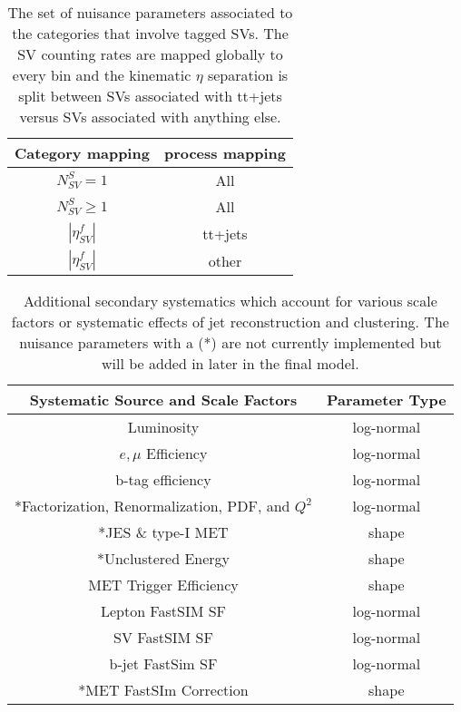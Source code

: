 \begin{table}
\centering
\caption{The set of nuisance parameters associated to the categories that involve tagged SVs. The SV counting rates are mapped globally to every bin and the kinematic $\eta$ separation is split between SVs associated with tt+jets versus SVs associated with anything else.}
\begin{tabular}{cc}
Category mapping & process mapping \\ 
\hline 
\hline
$N_{SV}^S=1$ & All \\ 
 
$N_{SV}^S \geq 1$ & All \\ 
 
$|\eta_{SV}^f|$ & tt+jets \\ 
 
$|\eta_{SV}^f|$ & other \\ 
\hline 
\end{tabular} 
\label{tab:svnuisance}

\end{table}

\begin{table}
\centering
\caption{Additional secondary systematics which account for various scale factors or systematic effects of jet reconstruction and clustering.  The nuisance parameters with a (*) are not currently implemented but will be added in later in the final model. }
\begin{tabular}{|c|c|}
\hline 
Systematic Source and Scale Factors & Parameter Type \\ 
\hline 
Luminosity & log-normal \\  
$e,\mu$ Efficiency & log-normal \\ 
b-tag efficiency & log-normal \\ 
*Factorization, Renormalization, PDF, and $Q^2$ & log-normal \\ 
*JES \& type-I MET & shape \\ 
*Unclustered Energy & shape \\ 
MET Trigger Efficiency & shape \\ 
Lepton FastSIM SF & log-normal \\ 
SV FastSIM SF & log-normal \\ 
b-jet FastSim SF & log-normal \\ 
*MET FastSIm Correction & shape \\ 
\hline 
\end{tabular} 
\label{tab:othernuisance}

\end{table}


